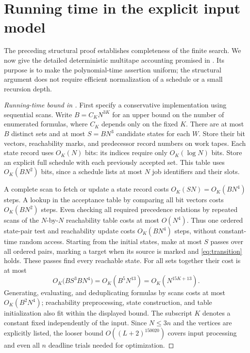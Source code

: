 \documentclass[11pt]{article}
\numberwithin{equation}{section}
\theoremstyle{definition}
\theoremstyle{remark}
\begin{document}





\section{Running time in the explicit input model}\label{sec:complexity}

The preceding structural proof establishes completeness of the finite
search. We now give the detailed deterministic multitape accounting
promised in . Its purpose is to make the
polynomial-time assertion uniform; the structural argument does not
require efficient normalization of a schedule or a small recursion depth.

\begin{proof}[Running-time bound in ]
First specify a conservative implementation using sequential scans.
Write \(B=C_KN^{3K}\) for an upper bound on the number of enumerated
formulas, where \(C_K\) depends only on the fixed \(K\).
There are at most \(B\) distinct sets and at most \(S=BN^3\)
candidate states for each \(W\).
Store their bit vectors, reachability marks, and predecessor record
numbers on work tapes. Each state record uses \(O_K(N)\) bits:
its indices require only \(O_K(\log N)\) bits.
Store an explicit full schedule with each previously accepted set.
This table uses \(O_K(BN^2)\) bits, since a schedule lists at most
\(N\) job identifiers and their slots.

A complete scan to fetch or update a state record costs
\(O_K(SN)=O_K(BN^4)\) steps. A lookup in the acceptance table by
comparing all bit vectors costs \(O_K(BN^2)\) steps.
Even checking all required precedence relations by repeated scans of
the \(N\)-by-\(N\) reachability table costs at most \(O(N^4)\).
Thus one ordered state-pair test and reachability update costs
\(O_K(BN^4)\) steps, without constant-time random access.
Starting from the initial states, make at most \(S\) passes over all
ordered pairs, marking a target when its source is marked and
\eqref{eq:transition} holds. These passes find every reachable state.
For all sets together their cost is at most
\[
 O_K\bigl(BS^3BN^4\bigr)
 =O_K(B^5N^{13})
 =O_K(N^{15K+13}).
\]
Generating, evaluating, and deduplicating formulas by scans costs at
most \(O_K(B^2N^4)\); reachability preprocessing, state construction,
and table initialization also fit within the displayed bound.
The subscript \(K\) denotes a constant fixed independently of the input.
Since \(N\le3n\) and the vertices are explicitly listed, the looser
bound \(O((L+2)^{150020})\) covers input processing and even all
\(n\) deadline trials needed for optimization.
\end{proof}
\end{document}
